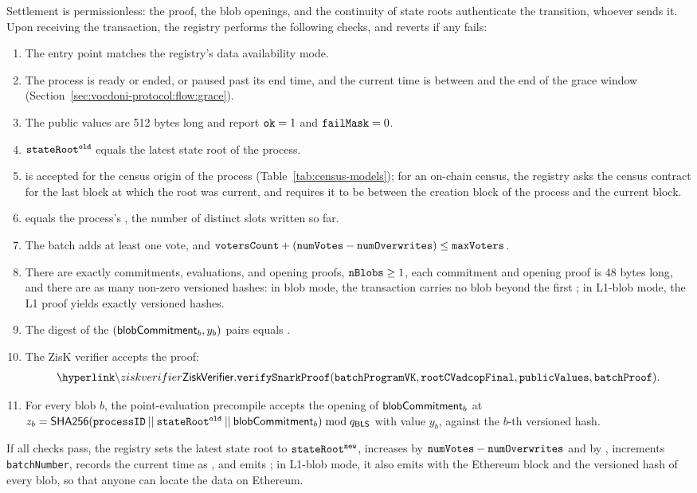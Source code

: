Settlement is permissionless: the proof, the blob openings, and the continuity of state roots authenticate the transition, whoever sends it. Upon receiving the transaction, the registry performs the following checks, and reverts if any fails:
\begin{enumerate}
	\item The entry point matches the registry's data availability mode.
	\item The process is ready or ended, or paused past its end time, and the current time is between \starttime and the end of the grace window (Section~\ref{sec:vocdoni-protocol:flow:grace}).
	\item The public values are 512 bytes long and report $\texttt{ok} = 1$ and $\texttt{failMask} = 0$.
	\item $\texttt{stateRoot}^\texttt{old}$ equals the latest state root of the process.
	\item \censusroot is accepted for the census origin of the process (Table~\ref{tab:census-models}); for an on-chain census, the registry asks the census contract for the last block at which the root was current, and requires it to be between the creation block of the process and the current block.
	\item \occupiedbefore equals the process's \voterscount, the number of distinct slots written so far.
	\item The batch adds at least one vote, and $\texttt{votersCount} + (\texttt{numVotes} - \texttt{numOverwrites}) \le \texttt{maxVoters}$.
	\item There are exactly \nblobs commitments, evaluations, and opening proofs, $\texttt{nBlobs} \ge 1$, each commitment and opening proof is 48 bytes long, and there are as many non-zero versioned hashes: in blob mode, the transaction carries no blob beyond the first \nblobs; in L1-blob mode, the L1 proof yields exactly \nblobs versioned hashes.
	\item The digest of the $({\sf{blobCommitment}}_b, y_b)$ pairs equals \blobsdigest.
	\item The ZisK verifier accepts the proof:
	\[\hlget{\ziskverifier}.\fn{verifySnarkProof}(\texttt{batchProgramVK}, \rootc, \publicvalues, \batchproof).\]
	\item For every blob $b$, the point-evaluation precompile accepts the opening of ${\sf{blobCommitment}}_b$ at $z_b = {\sf{SHA256}}(\texttt{processID} \:||\: \texttt{stateRoot}^\texttt{old} \:||\: {\sf{blobCommitment}}_b) \bmod q_{\mathsf{BLS}}$ with value $y_b$, against the $b$-th versioned hash.
\end{enumerate}
If all checks pass, the registry sets the latest state root to $\texttt{stateRoot}^\texttt{new}$, increases \voterscount by $\texttt{numVotes} - \texttt{numOverwrites}$ and \overwrittencount by \numoverwrites, increments \texttt{batchNumber}, records the current time as \lastvoteat, and emits ; in L1-blob mode, it also emits  with the Ethereum block and the versioned hash of every blob, so that anyone can locate the data on Ethereum.

